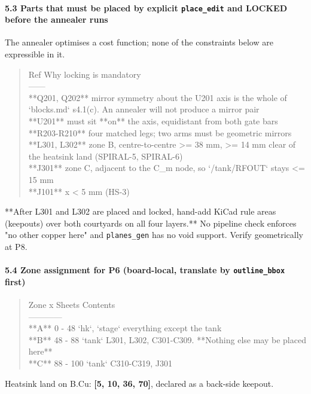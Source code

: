 \documentclass[11pt,a4paper]{article}
\begin{document}
\paragraph*{5.3 Parts that must be placed by explicit \texttt{place\_edit} and LOCKED before the annealer runs}
The annealer optimises a cost function; none of the constraints below are expressible in it.

\begin{quote}\small\ttfamily\raggedright
\textbar{} Ref \textbar{} Why locking is mandatory \textbar{}\\
\textbar{}---\textbar{}---\textbar{}\\
\textbar{} {*}{*}Q201, Q202{*}{*} \textbar{} mirror symmetry about the U201 axis is the whole of `blocks.md` s4.1(c). An annealer will not produce a mirror pair \textbar{}\\
\textbar{} {*}{*}U201{*}{*} \textbar{} must sit {*}{*}on{*}{*} the axis, equidistant from both gate bars \textbar{}\\
\textbar{} {*}{*}R203-R210{*}{*} \textbar{} four matched legs; two arms must be geometric mirrors \textbar{}\\
\textbar{} {*}{*}L301, L302{*}{*} \textbar{} zone B, centre-to-centre \textgreater{}= 38 mm, \textgreater{}= 14 mm clear of the heatsink land (SPIRAL-5, SPIRAL-6) \textbar{}\\
\textbar{} {*}{*}J301{*}{*} \textbar{} zone C, adjacent to the C\_m node, so `/tank/RFOUT` stays \textless{}= 15 mm \textbar{}\\
\textbar{} {*}{*}J101{*}{*} \textbar{} x \textless{} 5 mm (HS-3) \textbar{}
\end{quote}
{*}{*}After L301 and L302 are placed and locked, hand-add KiCad rule areas (keepouts) over both courtyards on all four layers.{*}{*} No pipeline check enforces "no other copper here" and \texttt{planes\_gen} has no void support. Verify geometrically at P8.

\paragraph*{5.4 Zone assignment for P6 (board-local, translate by \texttt{outline\_bbox} first)}
\begin{quote}\small\ttfamily\raggedright
\textbar{} Zone \textbar{} x \textbar{} Sheets \textbar{} Contents \textbar{}\\
\textbar{}---\textbar{}---\textbar{}---\textbar{}---\textbar{}\\
\textbar{} {*}{*}A{*}{*} \textbar{} 0 - 48 \textbar{} `hk`, `stage` \textbar{} everything except the tank \textbar{}\\
\textbar{} {*}{*}B{*}{*} \textbar{} 48 - 88 \textbar{} `tank` \textbar{} L301, L302, C301-C309. {*}{*}Nothing else may be placed here{*}{*} \textbar{}\\
\textbar{} {*}{*}C{*}{*} \textbar{} 88 - 100 \textbar{} `tank` \textbar{} C310-C319, J301 \textbar{}
\end{quote}
Heatsink land on B.Cu: \textbf{{[}5, 10, 36, 70{]}}, declared as a back-side keepout.
\end{document}
